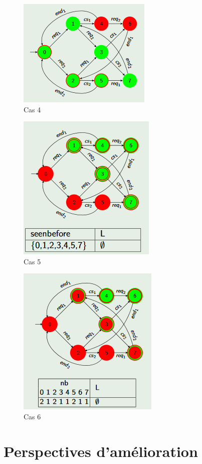 \documentclass[12pt,a4paper]{report}
\begin{document}
\begin{figure}[H]
  \centering
      \includegraphics[scale=1]{Images/cas4.PNG}
  \caption{Cas 4}
\end{figure}

\begin{figure}[H]
  \centering
      \includegraphics[scale=1]{Images/cas5.PNG}
  \caption{Cas 5}
\end{figure}

\begin{figure}[H]
  \centering
      \includegraphics[scale=1]{Images/cas6.PNG}
  \caption{Cas 6}
\end{figure}

\section*{Perspectives d'amélioration}
\end{document}

